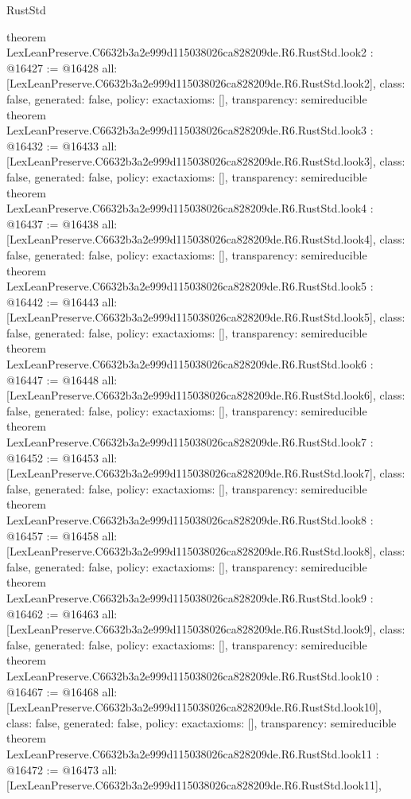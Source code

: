 \begin{lexlean}{RustStd}
\begin{coremodule}
{}
theorem LexLeanPreserve.C6632b3a2e999d115038026ca828209de.R6.RustStd.look2 : @16427 := @16428 {
  all: [LexLeanPreserve.C6632b3a2e999d115038026ca828209de.R6.RustStd.look2],
  class: false,
  generated: false,
  policy: exact{axioms: []},
  transparency: semireducible
}
theorem LexLeanPreserve.C6632b3a2e999d115038026ca828209de.R6.RustStd.look3 : @16432 := @16433 {
  all: [LexLeanPreserve.C6632b3a2e999d115038026ca828209de.R6.RustStd.look3],
  class: false,
  generated: false,
  policy: exact{axioms: []},
  transparency: semireducible
}
theorem LexLeanPreserve.C6632b3a2e999d115038026ca828209de.R6.RustStd.look4 : @16437 := @16438 {
  all: [LexLeanPreserve.C6632b3a2e999d115038026ca828209de.R6.RustStd.look4],
  class: false,
  generated: false,
  policy: exact{axioms: []},
  transparency: semireducible
}
theorem LexLeanPreserve.C6632b3a2e999d115038026ca828209de.R6.RustStd.look5 : @16442 := @16443 {
  all: [LexLeanPreserve.C6632b3a2e999d115038026ca828209de.R6.RustStd.look5],
  class: false,
  generated: false,
  policy: exact{axioms: []},
  transparency: semireducible
}
theorem LexLeanPreserve.C6632b3a2e999d115038026ca828209de.R6.RustStd.look6 : @16447 := @16448 {
  all: [LexLeanPreserve.C6632b3a2e999d115038026ca828209de.R6.RustStd.look6],
  class: false,
  generated: false,
  policy: exact{axioms: []},
  transparency: semireducible
}
theorem LexLeanPreserve.C6632b3a2e999d115038026ca828209de.R6.RustStd.look7 : @16452 := @16453 {
  all: [LexLeanPreserve.C6632b3a2e999d115038026ca828209de.R6.RustStd.look7],
  class: false,
  generated: false,
  policy: exact{axioms: []},
  transparency: semireducible
}
theorem LexLeanPreserve.C6632b3a2e999d115038026ca828209de.R6.RustStd.look8 : @16457 := @16458 {
  all: [LexLeanPreserve.C6632b3a2e999d115038026ca828209de.R6.RustStd.look8],
  class: false,
  generated: false,
  policy: exact{axioms: []},
  transparency: semireducible
}
theorem LexLeanPreserve.C6632b3a2e999d115038026ca828209de.R6.RustStd.look9 : @16462 := @16463 {
  all: [LexLeanPreserve.C6632b3a2e999d115038026ca828209de.R6.RustStd.look9],
  class: false,
  generated: false,
  policy: exact{axioms: []},
  transparency: semireducible
}
theorem LexLeanPreserve.C6632b3a2e999d115038026ca828209de.R6.RustStd.look10 : @16467 := @16468 {
  all: [LexLeanPreserve.C6632b3a2e999d115038026ca828209de.R6.RustStd.look10],
  class: false,
  generated: false,
  policy: exact{axioms: []},
  transparency: semireducible
}
theorem LexLeanPreserve.C6632b3a2e999d115038026ca828209de.R6.RustStd.look11 : @16472 := @16473 {
  all: [LexLeanPreserve.C6632b3a2e999d115038026ca828209de.R6.RustStd.look11],
}
\end{coremodule}
\end{lexlean}
